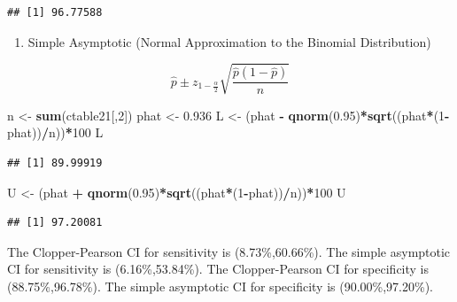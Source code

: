 \documentclass[]{article}
\newenvironment{Shaded}{\begin{snugshade}}{\end{snugshade}}
\newcommand{\DecValTok}[1]{\textcolor[rgb]{0.00,0.00,0.81}{#1}}
\newcommand{\FloatTok}[1]{\textcolor[rgb]{0.00,0.00,0.81}{#1}}
\newcommand{\KeywordTok}[1]{\textcolor[rgb]{0.13,0.29,0.53}{\textbf{#1}}}
\newcommand{\NormalTok}[1]{#1}
\newcommand{\OperatorTok}[1]{\textcolor[rgb]{0.81,0.36,0.00}{\textbf{#1}}}
\newcommand{\StringTok}[1]{\textcolor[rgb]{0.31,0.60,0.02}{#1}}
\providecommand{\tightlist}{%
  \setlength{\itemsep}{0pt}\setlength{\parskip}{0pt}}
\begin{document}
\begin{verbatim}
## [1] 96.77588
\end{verbatim}

\begin{enumerate}
\def\labelenumi{\arabic{enumi}.}
\setcounter{enumi}{1}
\tightlist
\item
  Simple Asymptotic (Normal Approximation to the Binomial Distribution)
\end{enumerate}

\[
\hat{p}\pm z_{1-\frac{\alpha}{2}}\sqrt{\frac{\hat{p}(1-\hat{p})}{n}}
\]

\begin{Shaded}
\begin{Highlighting}[]
\NormalTok{n <-}\StringTok{ }\KeywordTok{sum}\NormalTok{(ctable21[,}\DecValTok{2}\NormalTok{])}
\NormalTok{phat <-}\StringTok{ }\FloatTok{0.936}
\NormalTok{L <-}\StringTok{ }\NormalTok{(phat }\OperatorTok{-}\StringTok{ }\KeywordTok{qnorm}\NormalTok{(}\FloatTok{0.95}\NormalTok{)}\OperatorTok{*}\KeywordTok{sqrt}\NormalTok{((phat}\OperatorTok{*}\NormalTok{(}\DecValTok{1}\OperatorTok{-}\NormalTok{phat))}\OperatorTok{/}\NormalTok{n))}\OperatorTok{*}\DecValTok{100}
\NormalTok{L}
\end{Highlighting}
\end{Shaded}

\begin{verbatim}
## [1] 89.99919
\end{verbatim}

\begin{Shaded}
\begin{Highlighting}[]
\NormalTok{U <-}\StringTok{ }\NormalTok{(phat }\OperatorTok{+}\StringTok{ }\KeywordTok{qnorm}\NormalTok{(}\FloatTok{0.95}\NormalTok{)}\OperatorTok{*}\KeywordTok{sqrt}\NormalTok{((phat}\OperatorTok{*}\NormalTok{(}\DecValTok{1}\OperatorTok{-}\NormalTok{phat))}\OperatorTok{/}\NormalTok{n))}\OperatorTok{*}\DecValTok{100}
\NormalTok{U }
\end{Highlighting}
\end{Shaded}

\begin{verbatim}
## [1] 97.20081
\end{verbatim}

The Clopper-Pearson CI for sensitivity is (8.73\%,60.66\%). The simple
asymptotic CI for sensitivity is (6.16\%,53.84\%). The Clopper-Pearson
CI for specificity is (88.75\%,96.78\%). The simple asymptotic CI for
specificity is (90.00\%,97.20\%).
\end{document}
